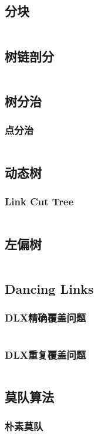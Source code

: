 \documentclass[a4paper,12pt]{article}
\begin{document}
\subsection{分块}
\inputminted[breaklines, linenos]{c++}{ds/decompose.cc}
\subsection{树链剖分}
\inputminted[breaklines, linenos]{c++}{ds/hld.cc}
\subsection{树分治}
\subsubsection{点分治}
\inputminted[breaklines, linenos]{c++}{ds/tree_divide.cc}
\subsection{动态树}
\subsubsection{Link Cut Tree}
\inputminted[breaklines, linenos]{c++}{ds/lct.cc}
\subsection{左偏树}
\inputminted[breaklines, linenos]{c++}{ds/leftist.cc}
\subsection{Dancing Links}
\subsubsection{DLX精确覆盖问题}
\inputminted[breaklines, linenos]{c++}{ds/exact_cover.cc}
\subsubsection{DLX重复覆盖问题}
\inputminted[breaklines, linenos]{c++}{ds/multi_cover.cc}
\subsection{莫队算法}
\subsubsection{朴素莫队}
\inputminted[breaklines, linenos]{c++}{ds/mo.cc}
\end{document}
